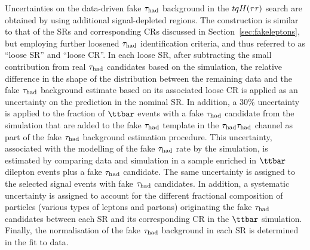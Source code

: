 Uncertainties on the data-driven fake $\tau_{\mathrm{had}}$ background in the $tqH(\tau\tau)$ search are obtained by using additional signal-depleted regions. The construction is similar to that of the SRs and corresponding CRs discussed in Section~\ref{sec:fakeleptons}, but employing further loosened $\tau_{\mathrm{had}}$ identification criteria, and thus referred to as ``loose SR''  and ``loose CR''. 
In each loose SR, after subtracting the small contribution from real $\tau_{\mathrm{had}}$ candidates based on the simulation, 
the relative difference in the shape of the distribution between the remaining data and the fake $\tau_{\mathrm{had}}$ background estimate based on its associated loose CR 
is applied as an uncertainty on the prediction in the nominal SR.
In addition, a 30\% uncertainty is applied to the fraction of $\ttbar$ events with a fake $\tau_{\mathrm{had}}$ candidate from the simulation that are added to the fake $\tau_{\mathrm{had}}$ template in the $\tau_{\mathrm{had}} \tau_{\mathrm{had}}$ channel as part of the fake $\tau_{\mathrm{had}}$ background estimation procedure. This uncertainty, associated with the modelling of the fake $\tau_{\mathrm{had}}$ rate by the simulation, is estimated by comparing data and simulation in a sample enriched in $\ttbar$ dilepton events plus a fake $\tau_{\mathrm{had}}$ candidate. 
The same uncertainty is assigned to the selected signal events with fake $\tau_{\mathrm{had}}$ candidates.
In addition, a systematic uncertainty is assigned to account for the different fractional composition of particles (various types of leptons and partons) originating the fake $\tau_{\mathrm{had}}$ candidates 
between each SR and its corresponding CR in the $\ttbar$ simulation. 
Finally, the normalisation of the fake $\tau_{\mathrm{had}}$ background in each SR is determined in the fit to data. 

